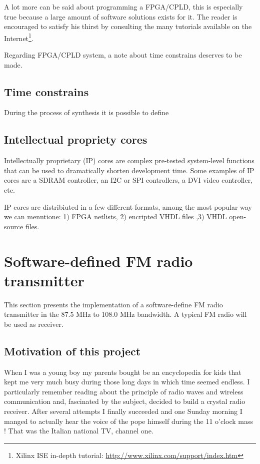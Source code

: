 \documentclass[13pt]{extreport}
\begin{document}
A lot more can be said about programming a FPGA/CPLD, this is especially true because a large amount of software solutions exists for it. The reader is encouraged to satisfy his thirst by consulting the many tutorials available on the Internet\footnote{Xilinx ISE in-depth tutorial: \scriptsize\url{http://www.xilinx.com/support/index.htm}}.

Regarding FPGA/CPLD system, a note about time constrains deserves to be made.

\subsection{Time constrains}
During the process of synthesis it is possible to define

\subsection{Intellectual propriety cores}
Intellectually proprietary (IP) cores are complex pre-tested system-level functions that can be used to dramatically shorten development time. Some examples of IP cores are a SDRAM controller, an I2C or SPI controllers, a DVI video controller, etc.

IP cores are distribiuted in a few different formats, among the most popular way we can menntione: 1) FPGA netlists, 2) encripted VHDL files ,3) VHDL open-source files.

\section{Software-defined FM radio transmitter}
This section presents the implementation of a software-define FM radio transmitter in the 87.5 MHz to 108.0 MHz bandwidth. A typical FM radio will be used as receiver.

\subsection{Motivation of this project}
When I was a young boy my parents bought be an encyclopedia for kids that kept me very much busy during those long days in which time seemed endless. I particularly remember reading about the principle of radio waves and wireless communication and, fascinated by the subject, decided to build a crystal radio receiver. After several attempts I finally succeeded and one Sunday morning I manged to actually hear the voice of the pope himself during the 11 o'clock mass ! That was the Italian national TV, channel one.
\end{document}
